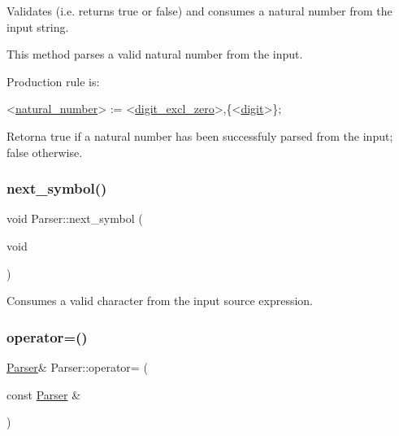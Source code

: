 Validates (i.\+e. returns true or false) and consumes a natural number from the input string. 

This method parses a valid natural number from the input.

Production rule is\+: 
\begin{DoxyCode}
<\hyperlink{classParser_a18974ec32c22bb2f19f3499986de6ada}{natural\_number}> := <\hyperlink{classParser_ac1522aacdb7de926636be0ca1067b915}{digit\_excl\_zero}>,\{<\hyperlink{classParser_ad9b268411777d28893f547653ece2206}{digit}>\};
\end{DoxyCode}


\begin{DoxyReturn}{Retorna}
true if a natural number has been successfuly parsed from the input; false otherwise. 
\end{DoxyReturn}
\mbox{\label{classParser_ac0919453374e9abfb0f55f41f057d7a1}} 
\subsubsection{\texorpdfstring{next\+\_\+symbol()}{next\_symbol()}}
{\footnotesize\ttfamily void Parser\+::next\+\_\+symbol (\begin{DoxyParamCaption}\item[{void}]{ }\end{DoxyParamCaption})\hspace{0.3cm}{\ttfamily [private]}}



Consumes a valid character from the input source expression. 

\mbox{\label{classParser_aa47e7e93b8d1ff76c51ce3028ff24ce6}} 
\subsubsection{\texorpdfstring{operator=()}{operator=()}}
{\footnotesize\ttfamily \hyperlink{classParser}{Parser}\& Parser\+::operator= (\begin{DoxyParamCaption}\item[{const \hyperlink{classParser}{Parser} \&}]{ }\end{DoxyParamCaption})\hspace{0.3cm}{\ttfamily [delete]}}



